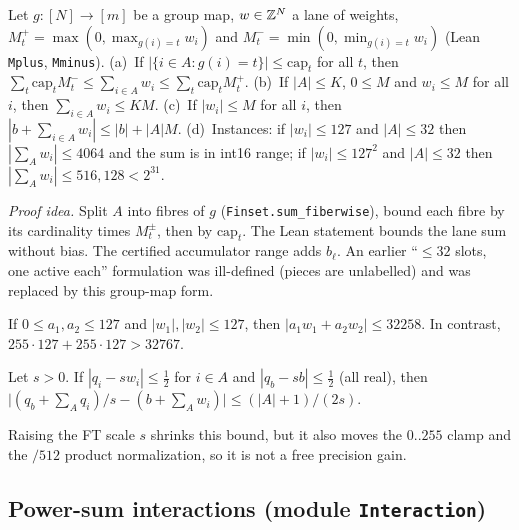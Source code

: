 \begin{theorem}\label{thm:t9}
Let $g:[N]\to[m]$ be a group map, $w\in\mathbb{Z}^N$ a lane of weights, $M^+_t=\max(0,\max_{g(i)=t}w_i)$ and $M^-_t=\min(0,\min_{g(i)=t}w_i)$ (Lean \texttt{Mplus}, \texttt{Mminus}).
(a)~If $|\{i\in A:g(i)=t\}|\le\mathrm{cap}_t$ for all $t$, then $\sum_t\mathrm{cap}_tM^-_t\le\sum_{i\in A}w_i\le\sum_t\mathrm{cap}_tM^+_t$.
(b)~If $|A|\le K$, $0\le M$ and $w_i\le M$ for all $i$, then $\sum_{i\in A}w_i\le KM$.
(c)~If $|w_i|\le M$ for all $i$, then $|b+\sum_{i\in A}w_i|\le|b|+|A|M$.
(d)~Instances: if $|w_i|\le127$ and $|A|\le32$ then $|\sum_Aw_i|\le4064$ and the sum is in int16 range; if $|w_i|\le127^2$ and $|A|\le32$ then $|\sum_Aw_i|\le516{,}128<2^{31}$.
\end{theorem}
\noindent\emph{Proof idea.} Split $A$ into fibres of $g$ (\texttt{Finset.sum\_fiberwise}), bound each fibre by its cardinality times $M^\pm_t$, then by $\mathrm{cap}_t$.
The Lean statement bounds the lane sum without bias. The certified accumulator range adds $b_\ell$.
An earlier ``$\le32$ slots, one active each'' formulation was ill-defined (pieces are unlabelled) and was replaced by this group-map form.

\begin{theorem}\label{thm:t10}
If $0\le a_1,a_2\le127$ and $|w_1|,|w_2|\le127$, then $|a_1w_1+a_2w_2|\le32258$.
In contrast, $255\cdot127+255\cdot127>32767$.
\end{theorem}

\begin{theorem}\label{thm:t11}
Let $s>0$. If $|q_i-sw_i|\le\frac12$ for $i\in A$ and $|q_b-sb|\le\frac12$ (all real), then
$\big|(q_b+\sum_Aq_i)/s-(b+\sum_Aw_i)\big|\le(|A|+1)/(2s)$.
\end{theorem}
\noindent Raising the FT scale $s$ shrinks this bound, but it also moves the $0..255$ clamp and the $/512$ product normalization, so it is not a free precision gain.

\subsection{Power-sum interactions (module \texttt{Interaction})}

